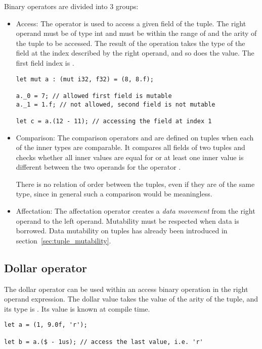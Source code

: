 Binary operators are divided into 3 groups:
\begin{itemize}
\item Access: The operator  is used to access a given field of the
  tuple. The right operand must be of type int and must be within the range of
   and the arity of the tuple to be accessed. The result of the
  operation takes the type of the field at the index described by the right
  operand, and so does the value. The first field index is .

  \begin{lstlisting}[style=coloredverbatim, linewidth=0.95\linewidth]
let mut a : (mut i32, f32) = (8, 8.f);

a._0 = 7; // allowed first field is mutable
a._1 = 1.f; // not allowed, second field is not mutable

let c = a.(12 - 11); // accessing the field at index 1
  \end{lstlisting}

\item Comparison: The comparison operators \token{==} and \token{!=} are
  defined on tuples when each of the inner types are comparable. It compares all
  fields of two tuples and checks whether all inner values are equal for
  \token{==} or at least one inner value is different between the two operands
  for the operator \token{!=}.

  There is no relation of order between the tuples, even if they are of the same
  type, since in general such a comparison would be meaningless.

\item Affectation: The affectation operator creates a \textit{data movement}
  from the right operand to the left operand. Mutability must be respected when
  data is borrowed. Data mutability on tuples has already been introduced in
  section~\ref{sec:tuple_mutability}.

\end{itemize}

\subsection {Dollar operator}

The dollar operator can be used within an access binary operation in the right
operand expression. The dollar value takes the value of the arity of the tuple,
and its type is . Its value is known at compile time.

\begin{lstlisting}[style=coloredverbatim]
let a = (1, 9.0f, 'r');

let b = a.($ - 1us); // access the last value, i.e. 'r'
\end{lstlisting}

